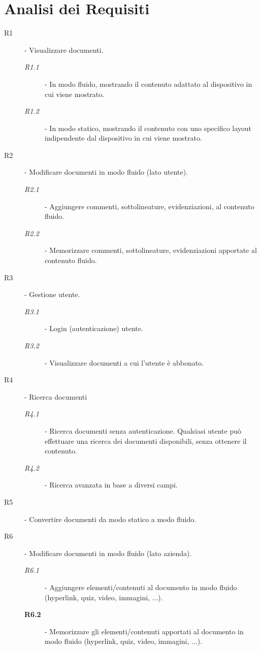 \section{Analisi dei Requisiti}
\begin{description}
    \item[R1] - Visualizzare documenti.
    \begin{description}
        \item[\textit{R1.1}] - In modo fluido, mostrando il contenuto adattato al dispositivo in cui viene mostrato.
        \item[\textit{R1.2}] - In modo statico, mostrando il contenuto con uno specifico layout indipendente dal dispositivo in cui viene mostrato.
    \end{description}
    \item[R2] - Modificare documenti in modo fluido (lato utente).
    \begin{description}
        \item[\textit{R2.1}] - Aggiungere commenti, sottolineature, evidenziazioni, al contenuto fluido.
        \item[\textit{R2.2}] - Memorizzare commenti, sottolineature, evidenziazioni apportate al contenuto fluido.
    \end{description}
    \item[R3] - Gestione utente.
    \begin{description}
        \item[\textit{R3.1}] - Login (autenticazione) utente.
        \item[\textit{R3.2}] - Visualizzare documenti a cui l'utente è abbonato.
    \end{description}
    \item[R4] - Ricerca documenti
    \begin{description}
        \item[\textit{R4.1}] - Ricerca documenti senza autenticazione. Qualsiasi utente può effettuare una ricerca dei documenti disponibili, senza ottenere il contenuto.
        \item[\textit{R4.2}] - Ricerca avanzata in base a diversi campi. %
    \end{description}
    \item[R5] - Convertire documenti da modo statico a modo fluido.
    \item[R6] - Modificare documenti in modo fluido (lato azienda).
    \begin{description}
        \item[\textit{R6.1}] - Aggiungere elementi/contenuti al documento in modo fluido (hyperlink, quiz, video, immagini, ...). %
        \item[\textbf{R6.2}] - Memorizzare gli elementi/contenuti apportati al documento in modo fluido (hyperlink, quiz, video, immagini, ...).
    \end{description}
\end{description}



